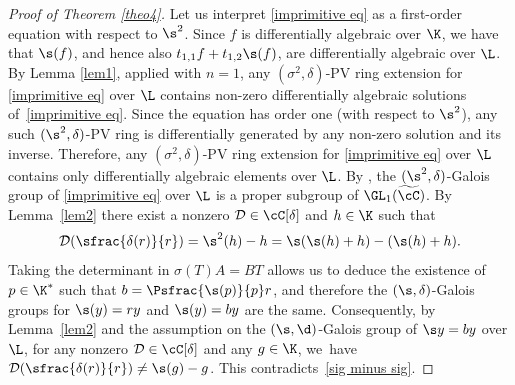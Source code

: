 \begin{proof}[Proof of Theorem \ref{theo4}]
Let us interpret \eqref{imprimitive eq} as a first-order equation with respect to $\s^2$. Since $f$ is differentially algebraic over $\K$, we have that $\s(f)$, and hence also ${t_{1,1}f+t_{1,2}\s(f)}$, are differentially algebraic over $\L$. By Lemma \ref{lem1}, applied with $n=1$, any $(\sigma^{2},\delta)$-PV ring extension for \eqref{imprimitive eq} over $\L$ contains non-zero differentially algebraic solutions of~\eqref{imprimitive eq}. Since the equation has order one (with respect to $\s^2$), any such $(\s^2,\delta)$-PV ring is differentially generated by any non-zero solution and its inverse. Therefore, any $(\sigma^{2},\delta)$-PV ring extension for \eqref{imprimitive eq} over $\L$ contains only differentially algebraic elements over $\L$. By \cite[Prop.\,6.26]{HS}, the $(\s^2,\delta)$-Galois group of \eqref{imprimitive eq} over $\L$ is a proper subgroup of $\GL_{1}(\widetilde{\cC})$. By Lemma~\ref{lem2} there exist a nonzero $\mathcal{D}\in \cC[\delta]$ and $h\in \K$ such that
\begin{equation}\label{sig minus sig}
\mathcal{D}(\sfrac{\delta(r)}{r})=\s^2(h)-h=\s(\s(h)+h)-(\s(h)+h).
\end{equation}
Taking the determinant in $\sigma(T)A=BT$ allows us to deduce the existence of
$p\in \K^{*}$ such that $b=\Psfrac{\s(p)}{p}r$, and therefore the $(\s,\delta)$-Galois groups for ${\s(y)=ry}$ and $\s(y)=by$ are the same. Consequently, by Lemma~\ref{lem2} and the assumption on the $(\s,\d)$-Galois group of $\s y=by$ over $\L$, for any nonzero $\mathcal{D}\in\cC[\delta]$ and any $g\in \K$, we~have $\mathcal{D}(\sfrac{\delta(r)}{r})\neq\s(g)-g$. This contradicts~\eqref{sig minus sig}.


\end{proof}
